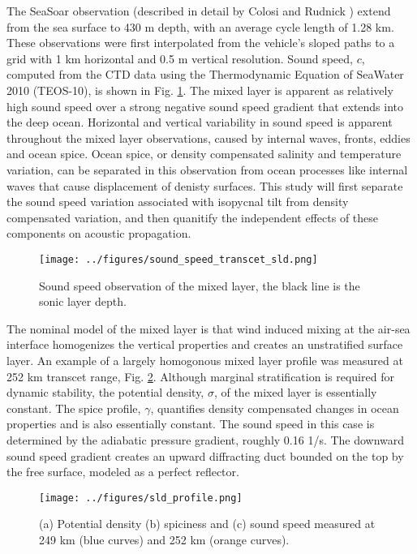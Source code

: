 \documentclass[preprint,NumberedRefs]{JASA}
\begin{document}
The SeaSoar observation (described in detail by Colosi and Rudnick \citep{colosi2020observations}) extend from the sea surface to 430 m depth, with an average cycle length of 1.28 km. These observations were first interpolated from the vehicle's sloped paths to a grid with 1 km horizontal and 0.5 m vertical resolution. Sound speed, $c$, computed from the CTD data using the Thermodynamic Equation of SeaWater 2010 (TEOS-10), is shown in Fig. \ref{fig:c_grid}. The mixed layer is apparent as relatively high sound speed over a strong negative sound speed gradient that extends into the deep ocean. Horizontal and vertical variability in sound speed is apparent throughout the mixed layer observations, caused by internal waves, fronts, eddies and ocean spice\citep{colosi2020observations}. Ocean spice, or density compensated salinity and temperature variation, can be separated in this observation from ocean processes like internal waves that cause displacement of denisty surfaces\citep{dzieciuch2004}. This study will first separate the sound speed variation associated with isopycnal tilt from density compensated variation, and then quanitify the independent effects of these components on acoustic propagation.

\begin{figure}
\texttt{[image: ../figures/sound\_speed\_transcet\_sld.png]}
\caption{\label{fig:c_grid}{Sound speed observation of the mixed layer, the black line is the sonic layer depth.}}
\end{figure}

The nominal model of the mixed layer is that wind induced mixing at the air-sea interface homogenizes the vertical properties and creates an unstratified surface layer. An example of a largely homogonous mixed layer profile was measured at 252 km transcet range, Fig. \ref{fig:profiles}. Although marginal stratification is required for dynamic stability, the potential density, $\sigma$, of the mixed layer is essentially constant. The spice profile, $\gamma$, quantifies density compensated changes in ocean properties and is also essentially constant. The sound speed in this case is determined by the adiabatic pressure gradient, roughly 0.16 1/s. The downward sound speed gradient creates an upward diffracting duct bounded on the top by the free surface, modeled as a perfect reflector.

\begin{figure}
\texttt{[image: ../figures/sld\_profile.png]}
    \caption{\label{fig:profiles}{(a) Potential density (b) spiciness and (c) sound speed measured at 249 km (blue curves) and 252 km (orange curves).}}
\end{figure}
\end{document}
